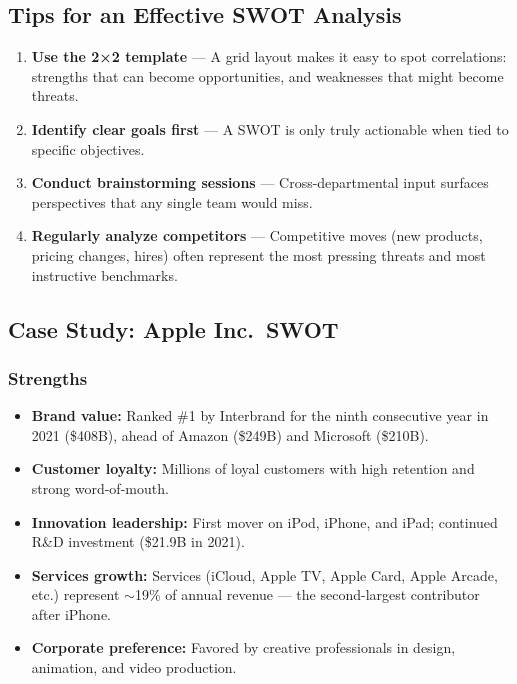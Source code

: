 \documentclass[11pt, letterpaper]{article}
\begin{document}
\subsection{Tips for an Effective SWOT Analysis}

\begin{enumerate}[leftmargin=*, label=\textbf{\arabic*.}]
  \item \textbf{Use the 2×2 template} --- A grid layout makes it easy to spot correlations: strengths that can become opportunities, and weaknesses that might become threats.
  \item \textbf{Identify clear goals first} --- A SWOT is only truly actionable when tied to specific objectives.
  \item \textbf{Conduct brainstorming sessions} --- Cross-departmental input surfaces perspectives that any single team would miss.
  \item \textbf{Regularly analyze competitors} --- Competitive moves (new products, pricing changes, hires) often represent the most pressing threats and most instructive benchmarks.
\end{enumerate}

\subsection{Case Study: Apple Inc.\ SWOT}

\subsubsection{Strengths}
\begin{itemize}[leftmargin=*]
  \item \textbf{Brand value:} Ranked \#1 by Interbrand for the ninth consecutive year in 2021 (\$408B), ahead of Amazon (\$249B) and Microsoft (\$210B).
  \item \textbf{Customer loyalty:} Millions of loyal customers with high retention and strong word-of-mouth.
  \item \textbf{Innovation leadership:} First mover on iPod, iPhone, and iPad; continued R\&D investment (\$21.9B in 2021).
  \item \textbf{Services growth:} Services (iCloud, Apple TV, Apple Card, Apple Arcade, etc.) represent $\sim$19\% of annual revenue --- the second-largest contributor after iPhone.
  \item \textbf{Corporate preference:} Favored by creative professionals in design, animation, and video production.
\end{itemize}
\end{document}
